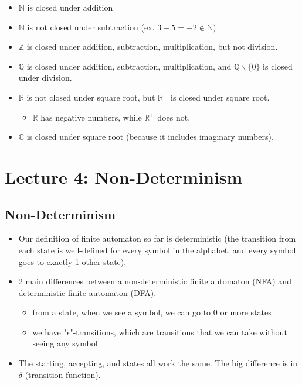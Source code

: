 \documentclass[11pt,a4paper]{article}
\begin{document}
\begin{itemize}
    \item $\mathbb{N}$ is closed under addition
    \item $\mathbb{N}$ is not closed under subtraction (ex. $3-5=-2\notin\mathbb{N})$
    \item $\mathbb{Z}$ is closed under addition, subtraction, multiplication, but not division.
    \item $\mathbb{Q}$ is closed under addition, subtraction, multiplication, and $\mathbb{Q} \backslash \{0\}$ is closed under division.
    \item $\mathbb{R}$ is not closed under square root, but $\mathbb{R^+}$ is closed under square root.
    \begin{itemize}
        \item $\mathbb{R}$ has negative numbers, while $\mathbb{R^+}$ does not.
    \end{itemize}
    \item $\mathbb{C}$ is closed under square root (because it includes imaginary numbers).
\end{itemize}





\section{Lecture 4: Non-Determinism}
\subsection{Non-Determinism}
\begin{itemize}
    \item Our definition of finite automaton so far is deterministic (the transition from each state is well-defined for every symbol in the alphabet, and every symbol goes to exactly 1 other state).
    \item 2 main differences between a non-deterministic finite automaton (NFA) and deterministic finite automaton (DFA).
    \begin{itemize}
        \item from a state, when we see a symbol, we can go to 0 or more states
        \item we have "$\epsilon$"-transitions, which are transitions that we can take without seeing any symbol
    \end{itemize}
    \item The starting, accepting, and states all work the same. The big difference is in $\delta$ (transition function).
\end{itemize}
\end{document}
